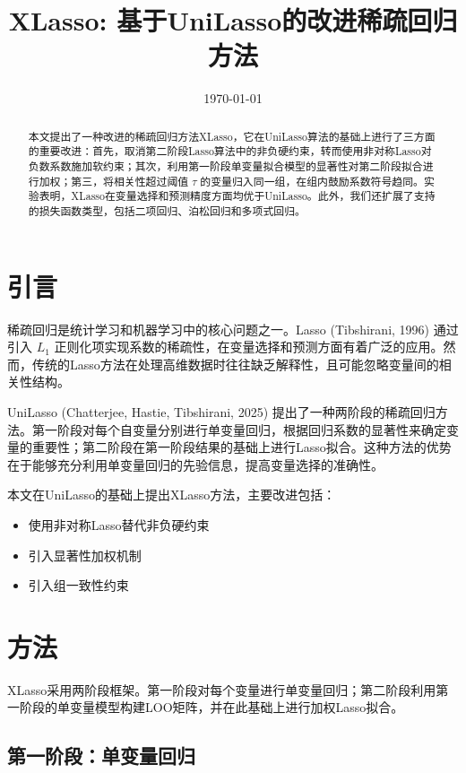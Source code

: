 \documentclass[12pt,a4paper]{article}
\title{XLasso: 基于UniLasso的改进稀疏回归方法}
\author{}
\date{\today}
\begin{document}
\maketitle

\begin{abstract}
本文提出了一种改进的稀疏回归方法XLasso，它在UniLasso算法的基础上进行了三方面的重要改进：首先，取消第二阶段Lasso算法中的非负硬约束，转而使用非对称Lasso对负数系数施加软约束；其次，利用第一阶段单变量拟合模型的显著性对第二阶段拟合进行加权；第三，将相关性超过阈值 $\tau$ 的变量归入同一组，在组内鼓励系数符号趋同。实验表明，XLasso在变量选择和预测精度方面均优于UniLasso。此外，我们还扩展了支持的损失函数类型，包括二项回归、泊松回归和多项式回归。
\end{abstract}

\section{引言}

稀疏回归是统计学习和机器学习中的核心问题之一。Lasso (Tibshirani, 1996) 通过引入 $L_1$ 正则化项实现系数的稀疏性，在变量选择和预测方面有着广泛的应用。然而，传统的Lasso方法在处理高维数据时往往缺乏解释性，且可能忽略变量间的相关性结构。

UniLasso (Chatterjee, Hastie, Tibshirani, 2025) 提出了一种两阶段的稀疏回归方法。第一阶段对每个自变量分别进行单变量回归，根据回归系数的显著性来确定变量的重要性；第二阶段在第一阶段结果的基础上进行Lasso拟合。这种方法的优势在于能够充分利用单变量回归的先验信息，提高变量选择的准确性。

本文在UniLasso的基础上提出XLasso方法，主要改进包括：
\begin{itemize}
    \item 使用非对称Lasso替代非负硬约束
    \item 引入显著性加权机制
    \item 引入组一致性约束
\end{itemize}

\section{方法}

XLasso采用两阶段框架。第一阶段对每个变量进行单变量回归；第二阶段利用第一阶段的单变量模型构建LOO矩阵，并在此基础上进行加权Lasso拟合。

\subsection{第一阶段：单变量回归}
\end{document}

